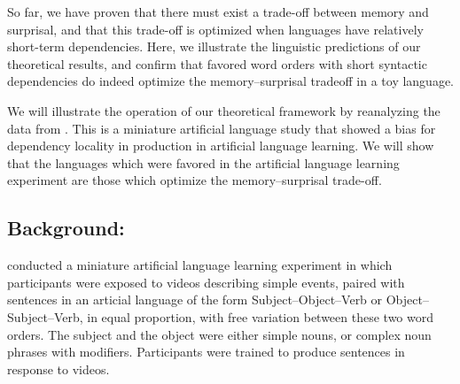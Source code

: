 So far, we have proven that there must exist a trade-off between memory and surprisal, and that this trade-off is optimized when languages have relatively short-term dependencies. Here, we illustrate the linguistic predictions of our theoretical results, and confirm that favored word orders with short syntactic dependencies do indeed optimize the memory--surprisal tradeoff in a toy language.

We will illustrate the operation of our theoretical framework by reanalyzing the data from \cite{fedzechkina-human-2017}.
This is a miniature artificial language study that showed a bias for dependency locality in production in artificial language learning. 
We will show that the languages which were favored in the artificial language learning experiment are those which optimize the memory--surprisal trade-off.

\subsection{Background: \citet{fedzechkina-human-2017}}

\citet{fedzechkina-human-2017} conducted a miniature artificial language learning experiment in which participants were exposed to videos describing simple events, paired with sentences in an articial language of the form Subject--Object--Verb or Object--Subject--Verb, in equal proportion, with free variation between these two word orders. The subject and the object were either simple nouns, or complex noun phrases with modifiers. Participants were trained to produce sentences in response to videos.

